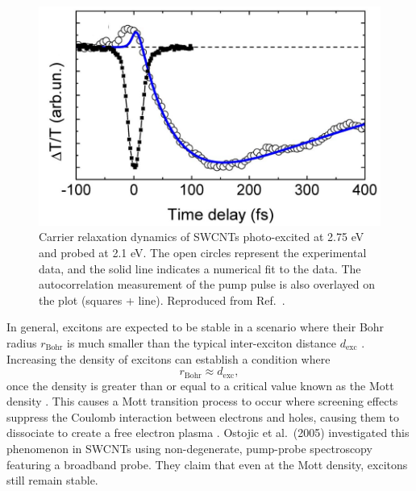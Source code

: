 \begin{figure}[ht]
	\centering
	\includegraphics[scale=1.3]{images/chapter_prior_works/e33_pump_e22_probe_manzoni}
	\caption{Carrier relaxation dynamics of SWCNTs photo-excited at 2.75 eV and probed at 2.1 eV. The open circles represent the experimental data, and the solid line indicates a numerical fit to the data. The autocorrelation measurement of the pump pulse is also overlayed on the plot (squares + line). Reproduced from Ref.\ \cite{manzoni2005intersubband}.}
	\label{fig:e33_pump_manzoni}
\end{figure}


In general, excitons are expected to be stable in a scenario where their Bohr radius $r_\text{Bohr}$ is much smaller than the typical inter-exciton distance $d_\text{exc}$ \cite{mott1961transition}. Increasing the density of excitons can establish a condition where
\begin{equation}
r_\text{Bohr} \approx d_\text{exc},
\end{equation}
once the density is greater than or equal to a critical value known as the Mott density \cite{mott1961transition}. This causes a Mott transition process to occur where screening effects suppress the Coulomb interaction between electrons and holes, causing them to dissociate to create a free electron plasma \cite{mott1961transition}. Ostojic et al.\ (2005) investigated this phenomenon in SWCNTs using non-degenerate, pump-probe spectroscopy \cite{ostojic2005stability} featuring a broadband probe. They claim that even at the Mott density, excitons still remain stable.

